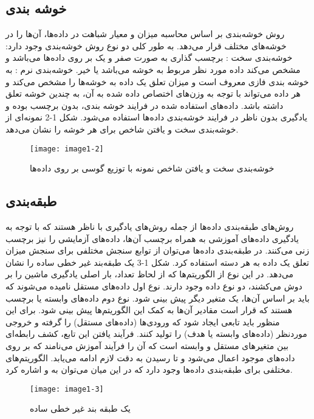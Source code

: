 \subsection{ خوشه بندی }
روش خوشه‌بندی بر اساس محاسبه میزان و معیار شباهت در داده‌ها، آن‌ها را در خوشه‌های مختلف قرار می‌دهد. به طور کلی دو نوع روش خوشه‌بندی وجود دارد:
خوشه‌بندی سخت : برچسب گذاری به صورت صفر و یک بر روی داده‌ها می‌باشد و مشخص می‌كند داده مورد نظر مربوط به خوشه می‌باشد یا خیر.
خوشه‌بندی نرم : به خوشه بندی فازی معروف است و میزان تعلق یک داده به خوشه‌ها را مشخص می‌کند و هر داده می‌تواند با توجه به وزن‌های اختصاص داده شده به آن، به چندین خوشه تعلق داشته باشد.
داده‌های استفاده شده در فرایند خوشه بندی، بدون برچسب بوده و یادگیری بدون ناظر  در فرایند خوشه‌بندی داده‌ها استفاده می‌شود. شكل 1-2 نمونه‌ای از خوشه‌بندی سخت و یافتن شاخص برای هر خوشه را نشان می‌دهد.
\begin{figure}[!h]
\centering
\texttt{[image: image1-2]}
\caption{ خوشه‌بندی سخت و یافتن شاخص نمونه با توزیع گوسی بر روی داده‌ها \cite{ref20}}\label{image1-2}
\end{figure}

\subsection{طبقه‌بندی}
روش‌های طبقه‌بندی داده‌ها از جمله روش‌های یادگیری با ناظر  هستند که با توجه به یادگیری داده‌های آموزشی به همراه برچسب آن‌ها، داده‌های آزمایشی را نیز برچسب زنی می‌کنند. در طبقه‌بندی داده‌ها می‌توان از توابع سنجش مختلفی برای سنجش میزان تعلق یک داده به هر دسته استفاده کرد. شکل 1-3 یک طبقه‌بند غیر خطی ساده را نشان می‌دهد.
در این نوع از الگوریتم‌ها که از لحاظ تعداد، بار اصلی یادگیری ماشین را بر دوش می‌کشند، دو نوع داده وجود دارند. نوع اول داده‌های مستقل نامیده می‌شوند که باید بر اساس آن‌ها، یک متغیر دیگر پیش بینی شود. نوع دوم داده‌های وابسته یا برچسب هستند که قرار است مقادیر آن‌ها به کمک این الگوریتم‌ها پیش بینی شود. برای این منظور باید تابعی ایجاد شود که ورودی‌ها (داده‌های مستقل) را گرفته و خروجی موردنظر (داده‌های وابسته یا هدف) را تولید کنند. فرآیند یافتن این تابع، کشف رابطه‌ای بین متغیرهای مستقل و وابسته است که آن را فرآیند آموزش می‌نامند که بر روی داده‌های موجود اعمال می‌شود و تا رسیدن به دقت لازم ادامه می‌یابد. الگوریتم‌های مختلفی برای طبقه‌بندی داده‌ها وجود دارد که در این میان می‌توان به  و  اشاره کرد.

\begin{figure}[h]
\centering
\texttt{[image: image1-3]}
\caption{ یک طبقه بند غیر خطی ساده \cite{ref19}}\label{image1-3}
\end{figure}

